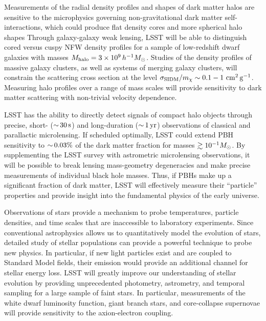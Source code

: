 \documentclass[12pt]{article}
\begin{document}
Measurements of the radial density profiles and shapes of dark matter halos are sensitive to the microphysics governing non-gravitational dark matter self-interactions, which could produce flat density cores \citep{Spergel:1999mh} and more spherical halo shapes \citep{Peter:2013}
Through galaxy-galaxy weak lensing, LSST will be able to distinguish cored versus cuspy NFW density profiles for a sample of low-redshift dwarf galaxies with masses $M_\text{halo} = 3\times10^9\,h^{-1}M_\odot$.
Studies of the density profiles of massive galaxy clusters, as well as systems of merging galaxy clusters, will constrain the scattering cross section at the level $\sigma_{\rm SIDM}/m_\chi \sim 0.1-1 \mathrm{\,\mathrm{\,cm}^2\mathrm{\,g}^{-1}}$.
Measuring halo profiles over a range of mass scales will provide sensitivity to dark matter scattering with non-trivial velocity dependence.

LSST has the ability to directly detect signals of compact halo objects through precise, short- ($ {\sim}\, 30 \mathrm{\,s}$) and long-duration ($ {\sim}\,1 \mathrm{\,yr}$) observations of classical and parallactic microlensing\citep{1509.04899}.
If scheduled optimally, LSST could extend PBH sensitivity to $ {\sim}\,0.03\%$ of the dark matter fraction for masses $\gtrsim 10^{-1} M_\odot$.
By supplementing the LSST survey with astrometric microlensing observations, it will be possible to break lensing mass-geometry degeneracies and make precise measurements of individual black hole masses. Thus, if PBHs make up a significant fraction of dark matter, LSST will effectively measure their ``particle'' properties and provide insight into the fundamental physics of the early universe.


Observations of stars provide a mechanism to probe temperatures, particle densities, and time scales that are inaccessible to laboratory experiments. Since conventional astrophysics allows us to quantitatively model the evolution of stars, detailed study of stellar populations can provide a powerful technique to probe new physics. In particular, if new light particles exist and are coupled to Standard Model fields, their emission would provide an additional channel for stellar energy loss. 
LSST will greatly improve our understanding of stellar evolution by providing unprecedented photometry, astrometry, and temporal sampling for a large sample of faint stars. In particular, measurements of the white dwarf luminosity function, giant branch stars, and core-collapse supernovae will provide sensitivity to the axion-electron coupling.
\end{document}
